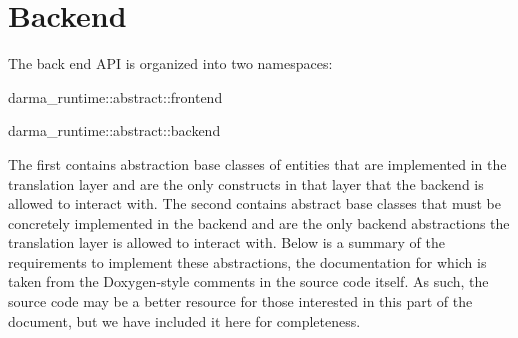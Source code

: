 
\chapter{Backend}
\label{chap:back_end}

The back end API is organized into two namespaces:
\begin{compactenum}
\item {\ttfamily darma\_runtime::abstract::frontend} 
\item {\ttfamily darma\_runtime::abstract::backend}  
\end{compactenum}

The first contains
abstraction base classes of entities that are implemented in the translation
layer and are the only constructs in that layer that the backend is
allowed to interact with.  The second contains abstract base classes that must be concretely implemented in the backend and
are the only backend abstractions the translation layer is allowed to interact
with.  Below is a summary of the requirements to implement these abstractions,
the documentation for which is taken from the Doxygen-style comments in
the source code itself.  As such, the source code may be a better resource for
those interested in this part of the document, but we have included it here for
completeness.  

